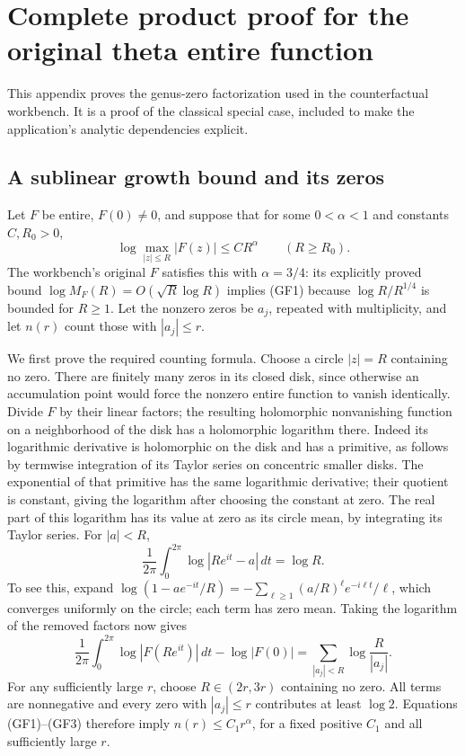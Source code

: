 \documentclass{article}
\begin{document}
\section{Complete product proof for the original theta entire function}
This appendix proves the genus-zero factorization used in the
counterfactual workbench. It is a proof of the classical special case,
included to make the application's analytic dependencies explicit.

\subsection{A sublinear growth bound and its zeros}
Let $F$ be entire, $F(0)\ne0$, and suppose that for some
$0<\alpha<1$ and constants $C,R_0>0$,
\[
\log\max_{|z|\le R}|F(z)|\le CR^\alpha\qquad(R\ge R_0).
\tag{GF1}
\]
The workbench's original $F$ satisfies this with $\alpha=3/4$:
its explicitly proved bound $\log M_F(R)=O(\sqrt R\log R)$
implies (GF1) because $\log R/R^{1/4}$ is bounded for $R\ge1$.
Let the nonzero zeros be $a_j$, repeated with multiplicity, and let
$n(r)$ count those with $|a_j|\le r$.

We first prove the required counting formula. Choose a circle
$|z|=R$ containing no zero. There are finitely many zeros in its
closed disk, since otherwise an accumulation point would force the
nonzero entire function to vanish identically. Divide $F$ by their
linear factors; the resulting holomorphic nonvanishing function
on a neighborhood of the disk has a holomorphic logarithm there.
Indeed its logarithmic derivative is holomorphic on the disk and
has a primitive, as follows by termwise integration of its Taylor
series on concentric smaller disks. The exponential of that primitive
has the same logarithmic derivative; their quotient is constant,
giving the logarithm after choosing the constant at zero.
The real part of this logarithm has its value at zero as its circle
mean, by integrating its Taylor series.
For $|a|<R$,
\[
\frac1{2\pi}\int_0^{2\pi}\log|Re^{it}-a|\,dt=\log R.
\tag{GF2}
\]
To see this, expand
$\log(1-ae^{-it}/R)=-\sum_{\ell\ge1}(a/R)^\ell e^{-i\ell t}/\ell$,
which converges uniformly on the circle; each term has zero mean.
Taking the logarithm of the removed factors now gives
\[
\frac1{2\pi}\int_0^{2\pi}\log|F(Re^{it})|\,dt-\log|F(0)|
=\sum_{|a_j|<R}\log\frac{R}{|a_j|}.
\tag{GF3}
\]
For any sufficiently large $r$, choose $R\in(2r,3r)$ containing
no zero. All terms are nonnegative and every zero with
$|a_j|\le r$ contributes at least $\log2$. Equations (GF1)--(GF3)
therefore imply $n(r)\le C_1r^\alpha$, for a fixed positive
$C_1$ and all sufficiently large $r$.
\end{document}
